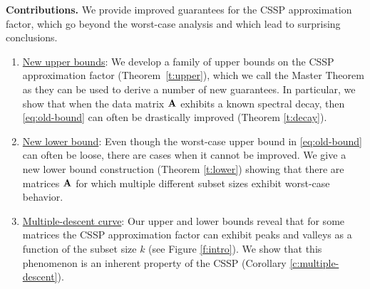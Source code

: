 \documentclass{article}
\begin{document}
\textbf{Contributions.} We provide improved guarantees for the CSSP
approximation factor, which go beyond the worst-case analysis and 
which lead to surprising conclusions.%
\begin{enumerate}
\item\underline{New upper bounds}:
We develop a family of upper bounds on the CSSP approximation factor
(Theorem~\ref{t:upper}), which we call the Master Theorem
as they can be used to derive a number 
of new guarantees. In particular, we show that when the data matrix $\mathbf A$ exhibits a
known spectral decay, then \eqref{eq:old-bound} can often be
drastically improved (Theorem \ref{t:decay}).
\item \underline{New lower bound}:
Even though the worst-case upper bound in \eqref{eq:old-bound} can often
be loose, there are cases when it cannot be improved.
We give a new lower bound construction (Theorem \ref{t:lower}) showing
that there are matrices $\mathbf A$ for which multiple different subset sizes exhibit
worst-case behavior.
\item \underline{Multiple-descent curve}: 
Our upper and lower bounds
reveal that for some matrices the CSSP approximation factor can exhibit
peaks and valleys as a function of the subset size $k$ (see Figure
\ref{f:intro}).  We show that this phenomenon is an inherent property
of the CSSP  (Corollary \ref{c:multiple-descent}).
\end{enumerate}
\end{document}
